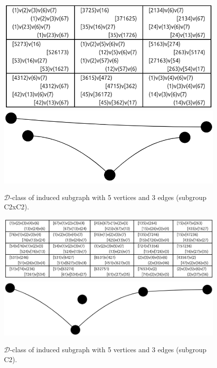 \begin{appendices}
\begin{figure}[H]
\includegraphics[scale=0.2]{images/x9/x9_5v_3e_2.png}
\includegraphics[scale=0.1]{images/x9/x9_5v_3e_2_vis.png}
\caption{$\mathcal{D}$-class of induced subgraph with 5 vertices and 3 edges (subgroup C2xC2).}
\end{figure}

\begin{figure}[H]
\includegraphics[scale=0.2]{images/x9/x9_5v_3e_3.png}
\includegraphics[scale=0.1]{images/x9/x9_5v_3e_3_vis.png}
\caption{$\mathcal{D}$-class of induced subgraph with 5 vertices and 3 edges (subgroup C2).}
\end{figure}


\end{appendices}
